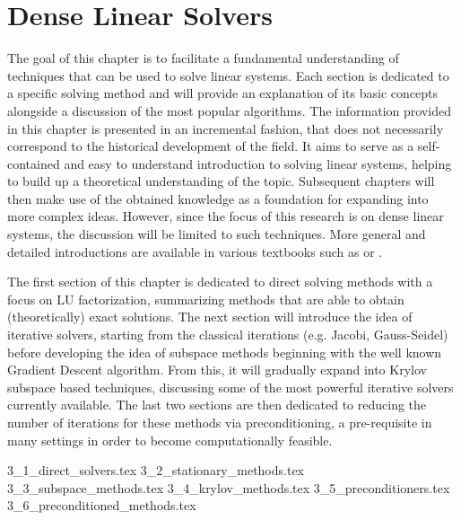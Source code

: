 \chapter{Dense Linear Solvers}
\label{chap:solvers}

The goal of this chapter is to facilitate a fundamental understanding of techniques that can be used to solve linear systems. Each section is dedicated to a specific solving method and will provide an explanation of its basic concepts alongside a discussion of the most popular algorithms. The information provided in this chapter is presented in an incremental fashion, that does not necessarily correspond to the historical development of the field. It aims to serve as a self-contained and easy to understand introduction to solving linear systems, helping to build up a theoretical understanding of the topic. Subsequent chapters will then make use of the obtained knowledge as a foundation for expanding into more complex ideas. However, since the focus of this research is on dense linear systems, the discussion will be limited to such techniques. More general and detailed introductions are available in various textbooks such as \cite{saad_iterative_2003} or \cite{golub_matrix_2013}.

The first section of this chapter is dedicated to direct solving methods with a focus on LU factorization, summarizing methods that are able to obtain (theoretically) exact solutions. The next section will introduce the idea of iterative solvers, starting from the classical iterations (e.g. Jacobi, Gauss-Seidel) before developing the idea of subspace methods beginning with the well known Gradient Descent algorithm. From this, it will gradually expand into Krylov subspace based techniques, discussing some of the most powerful iterative solvers currently available. The last two sections are then dedicated to reducing the number of iterations for these methods via preconditioning, a pre-requisite in many settings in order to become computationally feasible.


{3_1_direct_solvers.tex}
{3_2_stationary_methods.tex}
{3_3_subspace_methods.tex}
{3_4_krylov_methods.tex}
{3_5_preconditioners.tex}
{3_6_preconditioned_methods.tex}